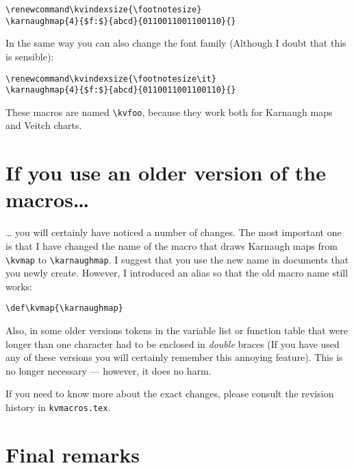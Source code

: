 \documentclass{article}
\begin{document}
\begin{verbatim}
\renewcommand\kvindexsize{\footnotesize}
\karnaughmap{4}{$f:$}{abcd}{0110011001100110}{}
\end{verbatim}

\begin{center}
    \renewcommand\kvindexsize{\footnotesize}
\end{center}

In the same way you can also change the font family (Although I doubt that
this is sensible):

\begin{verbatim}
\renewcommand\kvindexsize{\footnotesize\it}
\karnaughmap{4}{$f:$}{abcd}{0110011001100110}{}
\end{verbatim}

\begin{center}
    \renewcommand\kvindexsize{\footnotesize\it}
\end{center}


These macros are named \verb|\kvfoo|, because they work both for Karnaugh maps
and Veitch charts.

\section{If you use an older version of the macros\ldots}

\ldots{} you will certainly have noticed a number of changes. The most
important one is that I have changed the name of the macro that draws Karnaugh
maps from \verb|\kvmap| to \verb|\karnaughmap|. I suggest that you use the new
name in documents that you newly create. However, I introduced an alias so
that the old macro name still works:

\begin{verbatim}
\def\kvmap{\karnaughmap}
\end{verbatim}

Also, in some older versions tokens in the variable list or function table
that were longer than one character had to be enclosed in \emph{double} braces
(If you have used any of these versions you will certainly remember this
annoying  feature). This is no longer necessary   --- however, it does no
harm.

If you need to know more about the exact changes, please consult the revision
history in \verb|kvmacros.tex|.

\section{Final remarks}
\end{document}
